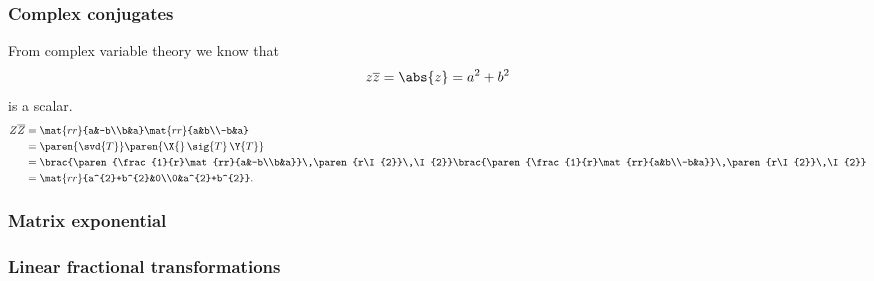 \subsubsection{Complex conjugates}
From complex variable theory we know that
\begin{equation}
  z\overline{z} = \abs{z} = a^{2}+b^{2}
\end{equation}
is a scalar.
\begin{equation}
  \begin{split}
    Z \overline{Z} &= \mat{rr}{a&-b\\b&a}\mat{rr}{a&b\\-b&a}\\
      &= \paren{\svd{T}}\paren{\X{}\,\sig{T}\,\Y{T}}\\
      &= \brac{\paren{\frac{1}{r}\mat{rr}{a&-b\\b&a}}\,\paren{r\I{2}}\,\I{2}} \brac{\paren{\frac{1}{r}\mat{rr}{a&b\\-b&a}}\,\paren{r\I{2}}\,\I{2}} \\
      &= \mat{rr}{a^{2}+b^{2}&0\\0&a^{2}+b^{2}}.
  \end{split}
\end{equation}

\subsubsection{Matrix exponential}

\subsubsection{Linear fractional transformations}


\endinput